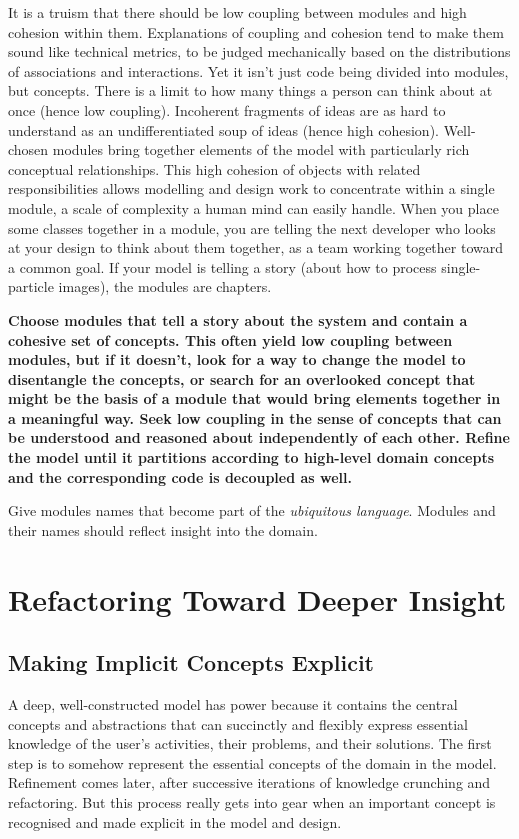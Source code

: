 \documentclass[a4paper,11pt]{article}
\begin{document}
It is a truism that there should be low coupling between modules and high cohesion within them. Explanations of coupling and cohesion tend to make them sound like technical metrics, to be judged mechanically based on the distributions of associations and interactions. Yet it isn't just code being divided into modules, but concepts. There is a limit to how many things a person can think about at once (hence low coupling). Incoherent fragments of ideas are as hard to understand as an undifferentiated soup of ideas (hence high cohesion). Well-chosen modules bring together elements of the model with particularly rich conceptual relationships. This high cohesion of objects with related responsibilities allows modelling and design work to concentrate within a single module, a scale of complexity a human mind can easily handle. When you place some classes together in a module, you are telling the next developer who looks at your design to think about them together, as a team working together toward a common goal. If your model is telling a story (about how to process single-particle images), the modules are chapters.

\textbf{Choose modules that tell a story about the system and contain a cohesive set of concepts. This often yield low coupling between modules, but if it doesn't, look for a way to change the model to disentangle the concepts, or search for an overlooked concept that might be the basis of a module that would bring elements together in a meaningful way. Seek low coupling in the sense of concepts that can be understood and reasoned about independently of each other. Refine the model until it partitions according to high-level domain concepts and the corresponding code is decoupled as well.}

Give modules names that become part of the \textit{ubiquitous language}. Modules and their names should reflect insight into the domain.

\section{Refactoring Toward Deeper Insight}

\subsection{Making Implicit Concepts Explicit}
A deep, well-constructed model has power because it contains the central concepts and abstractions that can succinctly and flexibly express essential knowledge of the user's activities, their problems, and their solutions. The first step is to somehow represent the essential concepts of the domain in the model. Refinement comes later, after successive iterations of knowledge crunching and refactoring. But this process really gets into gear when an important concept is recognised and made explicit in the model and design.
\end{document}
